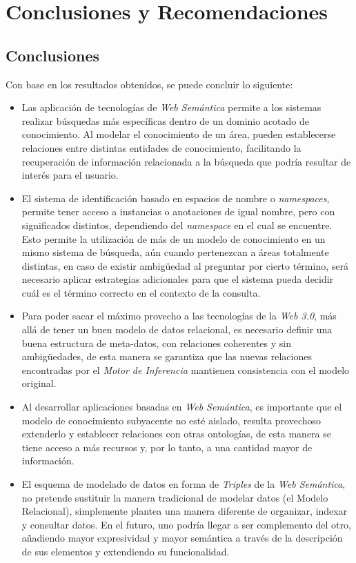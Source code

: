 \chapter{Conclusiones y Recomendaciones}
\label{chap:conclusiones}

\section{Conclusiones}
Con base en los resultados obtenidos, se puede concluir lo siguiente:
\begin{itemize}
    \item Las aplicación de tecnologías de \textit{Web Semántica} permite a los sistemas realizar búsquedas más específicas dentro de un dominio acotado de conocimiento. Al modelar el conocimiento de un área, pueden establecerse relaciones entre distintas entidades de conocimiento, facilitando la recuperación de información relacionada a la búsqueda que podría resultar de interés para el usuario.
    \item El sistema de identificación basado en espacios de nombre o \textit{namespaces}, permite tener acceso a instancias o anotaciones de igual nombre, pero con significados distintos, dependiendo del \textit{namespace} en el cual se encuentre. Esto permite la utilización de más de un modelo de conocimiento en un mismo sistema de búsqueda, aún cuando pertenezcan a áreas totalmente distintas, en caso de existir ambigüedad al preguntar por cierto término, será necesario aplicar estrategias adicionales para que el sistema pueda decidir cuál es el término correcto en el contexto de la consulta.
    \item Para poder sacar el máximo provecho a las tecnologías de la \textit{Web 3.0}, más allá de tener un buen modelo de datos relacional, es necesario definir una buena estructura de meta-datos, con relaciones coherentes y sin ambigüedades, de esta manera se garantiza que las nuevas relaciones encontradas por el \textit{Motor de Inferencia} mantienen consistencia con el modelo original.
    \item Al desarrollar aplicaciones basadas en \textit{Web Semántica}, es importante que el modelo de conocimiento subyacente no esté aislado, resulta provechoso extenderlo y establecer relaciones con otras ontologías, de esta manera se tiene acceso a más recursos y, por lo tanto, a una cantidad mayor de información.
    \item El esquema de modelado de datos en forma de \textit{Triples} de la \textit{Web Semántica}, no pretende sustituir la manera tradicional de modelar datos (el Modelo Relacional), simplemente plantea una manera diferente de organizar, indexar y consultar datos. En el futuro, uno podría llegar a ser complemento del otro, añadiendo mayor expresividad y mayor semántica a través de la descripción de sus elementos y extendiendo su funcionalidad.

\end{itemize}
